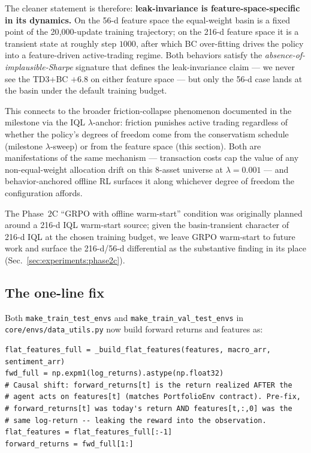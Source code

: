 The cleaner statement is therefore: \textbf{leak-invariance is
feature-space-specific in its dynamics.} On the 56-d feature space the
equal-weight basin is a fixed point of the 20{,}000-update training
trajectory; on the 216-d feature space it is a transient state at
roughly step $1000$, after which BC over-fitting drives the policy
into a feature-driven active-trading regime. Both behaviors satisfy
the \emph{absence-of-implausible-Sharpe} signature that defines the
leak-invariance claim --- we never see the TD3+BC $+6.8$ on either
feature space --- but only the 56-d case lands at the basin under the
default training budget.

This connects to the broader friction-collapse phenomenon documented
in the milestone via the IQL $\lambda$-anchor: friction punishes
active trading regardless of whether the policy's degrees of freedom
come from the conservatism schedule (milestone $\lambda$-sweep) or
from the feature space (this section). Both are manifestations of the
same mechanism --- transaction costs cap the value of any
non-equal-weight allocation drift on this 8-asset universe at
$\lambda{=}0.001$ --- and behavior-anchored offline RL surfaces it
along whichever degree of freedom the configuration affords.

The Phase~2C ``GRPO with offline warm-start'' condition was originally
planned around a 216-d IQL warm-start source; given the basin-transient
character of 216-d IQL at the chosen training budget, we leave GRPO
warm-start to future work and surface the 216-d/56-d differential as
the substantive finding in its place
(Sec.~\ref{sec:experiments:phase2c}).

\subsection{The one-line fix}
\label{app:leak:fix}

Both \texttt{make\_train\_test\_envs} and \texttt{make\_train\_val\_test\_envs}
in \texttt{core/envs/data\_utils.py} now build forward returns and
features as:

\begin{verbatim}
flat_features_full = _build_flat_features(features, macro_arr, sentiment_arr)
fwd_full = np.expm1(log_returns).astype(np.float32)
# Causal shift: forward_returns[t] is the return realized AFTER the
# agent acts on features[t] (matches PortfolioEnv contract). Pre-fix,
# forward_returns[t] was today's return AND features[t,:,0] was the
# same log-return -- leaking the reward into the observation.
flat_features = flat_features_full[:-1]
forward_returns = fwd_full[1:]
\end{verbatim}

